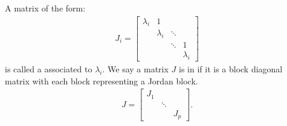     \begin{definition}
        A matrix of the form:
            \begin{equation*}
            \begin{split}
                J_i = 
                \begin{bmatrix}
                    \lambda_i & 1            &      &   \\
                            & \lambda_i    & \ddots &   \\
                            &            & \ddots & 1   \\
                            &            &      & \lambda_i       
                \end{bmatrix}
            \end{split}
            \end{equation*}
        is called a  associated to $\lambda_i$. We say a matrix $J$ is in  if it is a block diagonal matrix with each block representing a Jordan block.
            \begin{equation*}
            \begin{split}
                J = 
                \begin{bmatrix}
                    J_1 & \;     & \; \\
                    \;  & \ddots & \; \\ 
                    \;  & \;     & J_p
                \end{bmatrix}.
            \end{split}
            \end{equation*}
    \end{definition}



    

    


